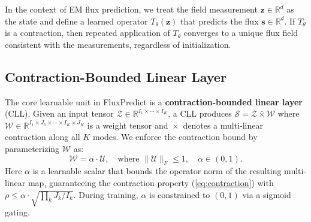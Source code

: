 \documentclass[11pt]{article}
\begin{document}
In the context of EM flux prediction, we treat the field measurement $\mathbf{z} \in \mathbb{R}^d$ as the state and define a learned operator $T_\theta(\mathbf{z})$ that predicts the flux $\mathbf{s} \in \mathbb{R}^d$. If $T_\theta$ is a contraction, then repeated application of $T_\theta$ converges to a unique flux field consistent with the measurements, regardless of initialization.

\subsection{Contraction-Bounded Linear Layer}

The core learnable unit in FluxPredict is a \textbf{contraction-bounded linear layer} (CLL). Given an input tensor $\mathcal{Z} \in \mathbb{R}^{I_1 \times \cdots \times I_K}$, a CLL produces $\mathcal{S} = \mathcal{Z} \bar{\times} \mathcal{W}$ where $\mathcal{W} \in \mathbb{R}^{I_1 \times J_1 \times \cdots \times I_K \times J_K}$ is a weight tensor and $\bar{\times}$ denotes a multi-linear contraction along all $K$ modes. We enforce the contraction bound by parameterizing $\mathcal{W}$ as:
\begin{equation}
    \mathcal{W} = \alpha \cdot \mathcal{U}, \quad \text{where } \|\mathcal{U}\|_F \leq 1, \quad \alpha \in (0, 1).
    \label{eq:cll}
\end{equation}
Here $\alpha$ is a learnable scalar that bounds the operator norm of the resulting multi-linear map, guaranteeing the contraction property (\ref{eq:contraction}) with $\rho \leq \alpha \cdot \sqrt{\prod_k J_k / I_k}$. During training, $\alpha$ is constrained to $(0, 1)$ via a sigmoid gating.
\end{document}

